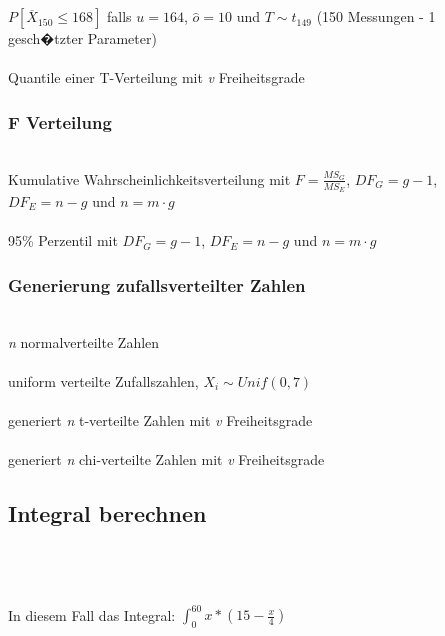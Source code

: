\documentclass{article}
\begin{document}
\begin{multicols*}{3}
 \\
 \\
$P[\overline{X}_{150} \leq 168]$ falls $u = 164$, $\hat{o} = 10$ und $T \sim t_{149}$ (150 Messungen - 1 gesch�tzter Parameter) \\

 \\
Quantile einer T-Verteilung mit \textit{v} Freiheitsgrade

\subsubsection*{F Verteilung}
\\
Kumulative Wahrscheinlichkeitsverteilung mit $F=\frac{MS_G}{MS_E}$, $DF_G = g - 1$, $DF_E = n - g$ und $n = m\cdot g$\\

\\
95\% Perzentil mit $DF_G = g - 1$, $DF_E = n - g$ und $n = m\cdot g$

\subsubsection*{Generierung zufallsverteilter Zahlen}

\\
\textit{n} normalverteilte Zahlen \\

 \\
uniform verteilte Zufallszahlen, $X_i \sim Unif(0, 7)$ \\

 \\
generiert \textit{n} t-verteilte Zahlen mit \textit{v} Freiheitsgrade \\

 \\
generiert \textit{n} chi-verteilte Zahlen mit \textit{v} Freiheitsgrade

\subsection*{Integral berechnen}
 \\
 \\
 \\
In diesem Fall das Integral: $\int_{0}^{60} x * (15 - \frac{x}{4})$


\end{multicols*}
\end{document}
